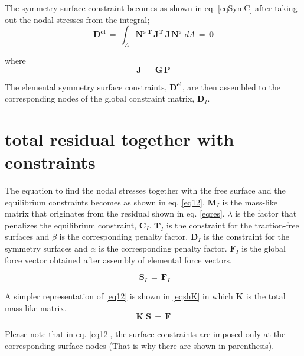 \documentclass{article}
\begin{document}
The symmetry surface constraint becomes as shown in eq. \eqref{eqSymC} after taking out the nodal stresses from the integral;
\begin{equation}
\mathbf{D^{el}} \,= \, \int _A  \mathbf{N^{s\;T}} \, \mathbf{J^T} \, \mathbf{J} \, \mathbf{N^s} \, \, dA  \,=\, \mathbf{0}
\label{eqSymC}
\end{equation}

where 
\begin{equation}
\mathbf{J} \,= \, \mathbf{G} \, \mathbf{P}
\end{equation}


The elemental symmetry surface constraints, $\mathbf{D^{el}}$, are then assembled to the corresponding nodes of the global constraint matrix, $\mathbf{D}_I$.


\section{total residual together with constraints}
The equation to find the nodal stresses together with the free surface and the equilibrium constraints becomes as shown in eq. \eqref{eq12}. $\mathbf{M}_I$ is the mass-like matrix that originates from the residual shown in eq. \eqref{eqres}. $\lambda$ is the factor that penalizes the equilibrium constraint, $\mathbf{C}_I$. $\mathbf{T}_I$ is the constraint for the traction-free surfaces and $\beta$ is the corresponding penalty factor. $\mathbf{D}_I$ is the constraint for the symmetry surfaces and $\alpha$ is the corresponding penalty factor. $\mathbf{F}_I$ is the global force vector obtained after assembly of elemental force vectors.  

\begin{equation}
[ \mathbf{M}_I \;+\; \lambda \, \mathbf{C}_I \; +\;( \beta \, \mathbf{T}_I) \;+\;( \alpha \, \mathbf{D}_I )]\; \mathbf{S}_I  \,=\, \mathbf{F}_I
\label{eq12}
\end{equation}

A simpler representation of \eqref{eq12} is shown in \eqref{eqshK} in which $\mathbf{K}$ is the total mass-like matrix.
\begin{equation}
\mathbf{K}\; \mathbf{S}  \,=\, \mathbf{F}
\label{eqshK}
\end{equation}

Please note that in eq. \eqref{eq12}, the surface constraints are imposed only at the corresponding surface nodes (That is why there are shown in parenthesis). 
\end{document}
